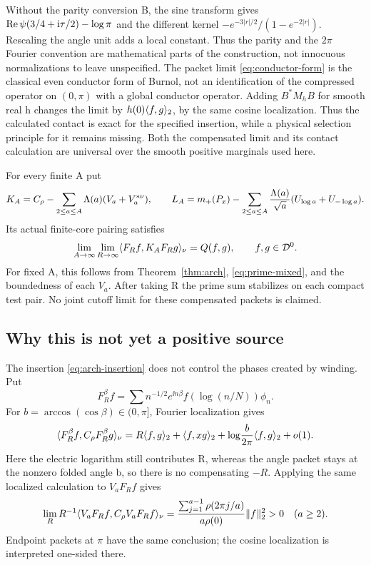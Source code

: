 Without the parity conversion B, the sine transform gives
$\operatorname{Re}\psi(3/4+\mathrm i\tau/2)-\log\pi$ and the different kernel
$-e^{-3|r|/2}/(1-e^{-2|r|})$. Rescaling the angle unit adds a
local constant. Thus the parity and the $2\pi$ Fourier convention
are mathematical parts of the construction, not innocuous
normalizations to leave unspecified.
The packet limit \eqref{eq:conductor-form} is the classical even
conductor form of Burnol, not an identification of the compressed
operator on $(0,\pi)$ with a global conductor operator.
Adding $B^*M_hB$ for smooth real h changes the limit by
$h(0)\langle f,g\rangle_2$, by the same cosine localization. Thus the
calculated contact is exact for the specified insertion, while
a physical selection principle for it remains missing.
Both the compensated limit and its contact calculation are universal
over the smooth positive marginals used here.

For every finite A put
\begin{equation}\label{eq:finite-signed}
K_A=C_\rho-\sum_{2\le a\le A}\Lambda(a)(V_a+V_a^{*\nu}),
\qquad
L_A=m_+(P_x)-\sum_{2\le a\le A}\frac{\Lambda(a)}{\sqrt a}
(U_{\log a}+U_{-\log a}).
\end{equation}
Its actual finite-core pairing satisfies
\begin{equation}\label{eq:complete-signed}
\lim_{A\to\infty}\lim_{R\to\infty}
\langle F_Rf,K_AF_Rg\rangle_\nu=Q(f,g),\qquad f,g\in\mathcal D^0 .
\end{equation}
For fixed A, this follows from Theorem~\ref{thm:arch},
\eqref{eq:prime-mixed}, and the boundedness of each $V_a$.
After taking R the prime sum stabilizes on each compact test pair.
No joint cutoff limit for these compensated packets is claimed.

\subsection{Why this is not yet a positive source}
The insertion \eqref{eq:arch-insertion} does not control the
phases created by winding. Put
\[
F_R^\beta f=\sum n^{-1/2}e^{\ii n\beta}f(\log(n/N))\phi_n.
\]
For $b=\arccos(\cos\beta)\in(0,\pi]$, Fourier localization gives
\begin{equation}\label{eq:nonidentity-arch}
\langle F_R^\beta f,C_\rho F_R^\beta g\rangle_\nu
=R\langle f,g\rangle_2+\langle f,xg\rangle_2+
\log\!\frac b{2\pi}\langle f,g\rangle_2+o(1).
\end{equation}
Here the electric logarithm still contributes R, whereas the
angle packet stays at the nonzero folded angle b, so there is
no compensating $-R$. Applying the same localized calculation
to $V_aF_Rf$ gives
\begin{equation}
\lim_R R^{-1}\langle V_aF_Rf,C_\rho V_aF_Rf\rangle_\nu
=\frac{\sum_{j=1}^{a-1}\rho(2\pi j/a)}{a\rho(0)}\lVert f\rVert_2^2>0
\quad(a\ge2).
\end{equation}
Endpoint packets at $\pi$ have the same conclusion; the cosine
localization is interpreted one-sided there.

